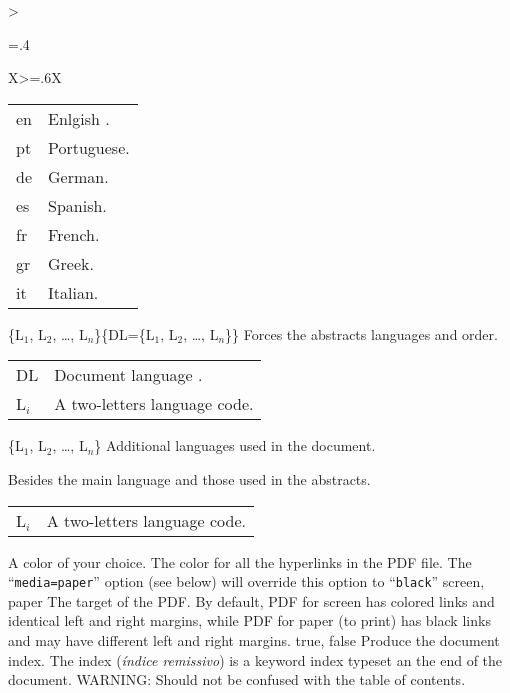 \begin{xltabular}{\linewidth}{>{\hsize=.4\hsize\raggedright\arraybackslash}X>{\hsize=.6\hsize}X}
{    \begin{tabular}{@{}l@{ $\rightarrow$ }X@{}}
         en & Enlgish .\\
         pt & Portuguese.\\
         de & German.\\
         es & Spanish.\\
         fr & French.\\
         gr & Greek.\\
         it & Italian.\\
    \end{tabular}
    }
    \midrule
    {\{L$_1$, L$_2$, …, L$_n$\}\newline \{DL=\{L$_1$, L$_2$, …, L$_n$\}\}}%
    {Forces the abstracts languages and order.}{
    \begin{tabular}{@{}l@{ $\rightarrow$ }X@{}}
         DL & Document language .\\
         L$_i$ & A two-letters language code.\\
    \end{tabular}
    }
    \midrule
    {\{L$_1$, L$_2$, …, L$_n$\}}%
    {Additional languages used in the document.}{
    Besides the main language and those used in the abstracts.\newline
    \begin{tabular}{@{}l@{ $\rightarrow$ }X@{}}
         L$_i$ & A two-letters language code.\\
    \end{tabular}
    }
    \midrule
    {A color of your choice.}%
    {The color for all the hyperlinks in the PDF file.}%
    { 
     The “\texttt{media=paper}” option (see below) will override this option to “\texttt{black}”}
    \midrule
    {screen, paper}%
    {The target of the PDF.}%
    { 
     By default, PDF for screen has colored links and identical left and right margins, while PDF for paper (to print) has black links and may have different left and right margins.}
    \midrule
    {true, false}%
    {Produce the document index.}%
    { 
     The index (\emph{índice remissivo}) is a keyword index typeset an the end of the document. WARNING: Should not be confused with the table of contents.}
    \midrule
    

\end{xltabular}
